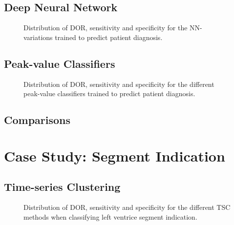 \newpage

\subsection{Deep Neural Network}

\begin{figure}[htb]
    \centering
    
    \caption{Distribution of DOR, sensitivity and specificity for the NN-variations trained to predict patient diagnosis.}
    \label{fig:dl_ind_dor_sens_spec_dist}
\end{figure}

\newpage

\subsection{Peak-value Classifiers}

\begin{figure}[htb]
    \centering
    
    \caption{Distribution of DOR, sensitivity and specificity for the different peak-value classifiers trained to predict patient diagnosis.}
    \label{fig:pvmlc_ind_dor_sens_spec_dist}
\end{figure}

\newpage

\subsection{Comparisons}

\newpage

\section{Case Study: Segment Indication}

\subsection{Time-series Clustering}

\begin{figure}[htb]
    \centering
    \caption{Distribution of DOR, sensitivity and specificity for the different TSC methods when classifying left ventrice segment indication.}
    \label{fig:tsc_segm_ind_dor_sens_spec_dist}
\end{figure}

